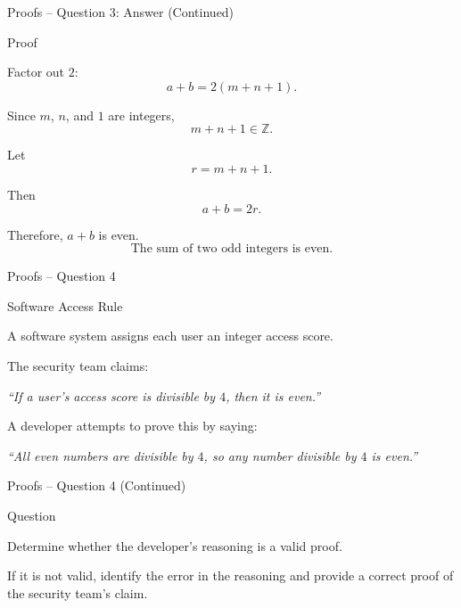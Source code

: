 
\begin{frame}{Proofs -- Question 3: Answer (Continued)}

\begin{exampleblock}{Proof}

Factor out $2$:
\[
a+b=2(m+n+1).
\]

Since $m$, $n$, and $1$ are integers,
\[
m+n+1\in\mathbb{Z}.
\]

Let
\[
r=m+n+1.
\]

Then
\[
a+b=2r.
\]

Therefore, $a+b$ is even.
\[
\boxed{\text{The sum of two odd integers is even.}}
\]

\end{exampleblock}

\end{frame}


\begin{frame}{Proofs -- Question 4}

\begin{block}{Software Access Rule}

A software system assigns each user an integer access score.

The security team claims:

\begin{center}
\textit{``If a user's access score is divisible by $4$, then it is even.''}
\end{center}

A developer attempts to prove this by saying:

\begin{center}
\textit{``All even numbers are divisible by $4$, so any number divisible
by $4$ is even.''}
\end{center}

\end{block}

\end{frame}


\begin{frame}{Proofs -- Question 4 (Continued)}

\begin{block}{Question}

Determine whether the developer's reasoning is a valid proof.

\medskip

If it is not valid, identify the error in the reasoning and provide a
correct proof of the security team's claim.

\end{block}

\end{frame}

